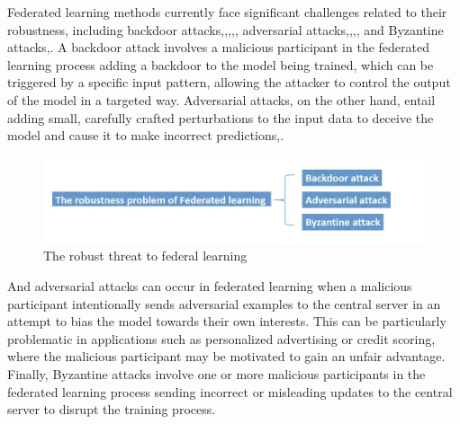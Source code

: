 \documentclass[conference]{IEEEtran}
\begin{document}
Federated learning methods currently face significant challenges related to their robustness, including backdoor attacks\cite{b24},\cite{b25},\cite{b26},\cite{b27},\cite{b28}, adversarial attacks\cite{b31},\cite{b32},\cite{b33},\cite{b34}, and Byzantine attacks\cite{b29},\cite{b30}. 
A backdoor attack involves a malicious participant in the federated learning process adding a backdoor to the model being trained, which can be triggered by a specific input pattern, 
allowing the attacker to control the output of the model in a targeted way. Adversarial attacks, on the other hand, entail adding small, 
carefully crafted perturbations to the input data to deceive the model and cause it to make incorrect predictions\cite{31},\cite{32}.   

\begin{figure}[htbp]
    \centerline{\includegraphics[width=0.8\linewidth,height=0.4\linewidth]{picture/f4.jpg}}
    \caption{The robust threat to federal learning}
    \label{fig2}
\end{figure}
And adversarial attacks can occur in federated learning when a malicious participant intentionally sends adversarial examples to the central server in an attempt to bias the model 
towards their own interests. This can be particularly problematic in applications such as personalized advertising or credit scoring, where the malicious participant may be motivated 
to gain an unfair advantage. Finally, Byzantine attacks involve one or more malicious participants in the federated learning process sending incorrect or misleading updates to the 
central server to disrupt the training process\cite{b35}.  
\end{document}
